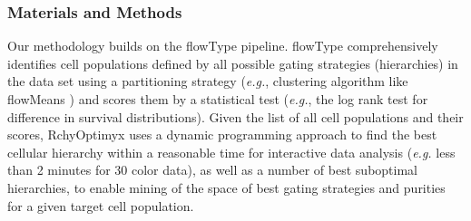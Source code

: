 




\subsubsection{Materials and Methods}
Our methodology builds on the flowType pipeline\cite{Aghaeepour2012}.  flowType comprehensively  identifies  cell
populations defined by all possible gating strategies (hierarchies) in the data set using a partitioning strategy (\emph{e.g.}, clustering algorithm like flowMeans \cite{Aghaeepour2012}) and scores them by a statistical test (\emph{e.g.}, the log
rank test for difference in survival distributions).  
Given the list of all cell populations and their scores, RchyOptimyx uses a
dynamic programming approach to find the best cellular hierarchy within a reasonable time for interactive data analysis (\emph{e.g.} less than 2 minutes for 30 color data), as well as a number of best
suboptimal hierarchies, to enable mining of the space of best gating strategies and purities for a given target cell population.


